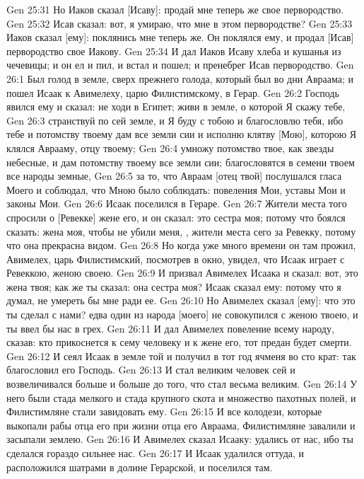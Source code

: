 \vs Gen 25:31 Но Иаков сказал [Исаву]: продай мне теперь же свое первородство.
\vs Gen 25:32 Исав сказал: вот, я умираю, что мне в этом первородстве?
\vs Gen 25:33 Иаков сказал [ему]: поклянись мне теперь же. Он поклялся ему, и продал [Исав] первородство свое Иакову.
\vs Gen 25:34 И дал Иаков Исаву хлеба и кушанья из чечевицы; и он ел и пил, и встал и пошел; и пренебрег Исав первородство.
\vs Gen 26:1 Был голод в земле, сверх прежнего голода, который был во дни Авраама; и пошел Исаак к Авимелеху, царю Филистимскому, в Герар.
\vs Gen 26:2 Господь явился ему и сказал: не ходи в Египет; живи в земле, о которой Я скажу тебе,
\vs Gen 26:3 странствуй по сей земле, и Я буду с тобою и благословлю тебя, ибо тебе и потомству твоему дам все земли сии и исполню клятву [Мою], которою Я клялся Аврааму, отцу твоему;
\vs Gen 26:4 умножу потомство твое, как звезды небесные, и дам потомству твоему все земли сии; благословятся в семени твоем все народы земные,
\vs Gen 26:5 за то, что Авраам [отец твой] послушался гласа Моего и соблюдал, что Мною  было соблюдать: повеления Мои, уставы Мои и законы Мои.
\vs Gen 26:6 Исаак поселился в Гераре.
\vs Gen 26:7 Жители места того спросили о [Ревекке] жене его, и он сказал: это сестра моя; потому что боялся сказать: жена моя, чтобы не убили меня, , жители места сего за Ревекку, потому что она прекрасна видом.
\vs Gen 26:8 Но когда уже много времени он там прожил, Авимелех, царь Филистимский, посмотрев в окно, увидел, что Исаак играет с Ревеккою, женою своею.
\vs Gen 26:9 И призвал Авимелех Исаака и сказал: вот, это жена твоя; как же ты сказал: она сестра моя? Исаак сказал ему: потому что я думал, не умереть бы мне ради ее.
\vs Gen 26:10 Но Авимелех сказал [ему]: что это ты сделал с нами? едва один из народа [моего] не совокупился с женою твоею, и ты ввел бы нас в грех.
\vs Gen 26:11 И дал Авимелех повеление всему народу, сказав: кто прикоснется к сему человеку и к жене его, тот предан будет смерти.
\vs Gen 26:12 И сеял Исаак в земле той и получил в тот год ячменя во сто крат: так благословил его Господь.
\vs Gen 26:13 И стал великим человек сей и возвеличивался больше и больше до того, что стал весьма великим.
\vs Gen 26:14 У него были стада мелкого и стада крупного скота и множество пахотных полей, и Филистимляне стали завидовать ему.
\vs Gen 26:15 И все колодези, которые выкопали рабы отца его при жизни отца его Авраама, Филистимляне завалили и засыпали землею.
\vs Gen 26:16 И Авимелех сказал Исааку: удались от нас, ибо ты сделался гораздо сильнее нас.
\vs Gen 26:17 И Исаак удалился оттуда, и расположился шатрами в долине Герарской, и поселился там.
